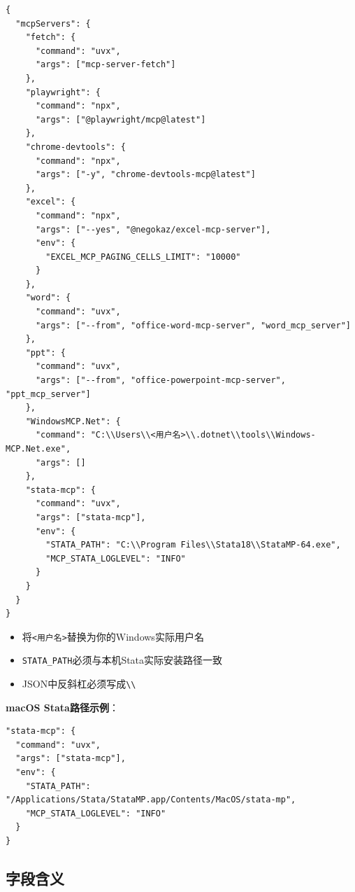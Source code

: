 \begin{lstlisting}[style=json]
{
  "mcpServers": {
    "fetch": {
      "command": "uvx",
      "args": ["mcp-server-fetch"]
    },
    "playwright": {
      "command": "npx",
      "args": ["@playwright/mcp@latest"]
    },
    "chrome-devtools": {
      "command": "npx",
      "args": ["-y", "chrome-devtools-mcp@latest"]
    },
    "excel": {
      "command": "npx",
      "args": ["--yes", "@negokaz/excel-mcp-server"],
      "env": {
        "EXCEL_MCP_PAGING_CELLS_LIMIT": "10000"
      }
    },
    "word": {
      "command": "uvx",
      "args": ["--from", "office-word-mcp-server", "word_mcp_server"]
    },
    "ppt": {
      "command": "uvx",
      "args": ["--from", "office-powerpoint-mcp-server", "ppt_mcp_server"]
    },
    "WindowsMCP.Net": {
      "command": "C:\\Users\\<用户名>\\.dotnet\\tools\\Windows-MCP.Net.exe",
      "args": []
    },
    "stata-mcp": {
      "command": "uvx",
      "args": ["stata-mcp"],
      "env": {
        "STATA_PATH": "C:\\Program Files\\Stata18\\StataMP-64.exe",
        "MCP_STATA_LOGLEVEL": "INFO"
      }
    }
  }
}
\end{lstlisting}

\begin{warningbox}[路径替换提醒]
\begin{itemize}[leftmargin=1em]
  \item 将\texttt{<用户名>}替换为你的Windows实际用户名
  \item \texttt{STATA\_PATH}必须与本机Stata实际安装路径一致
  \item JSON中反斜杠必须写成\texttt{\textbackslash\textbackslash}
\end{itemize}
\end{warningbox}

\textbf{macOS Stata路径示例}：

\begin{lstlisting}[style=json]
"stata-mcp": {
  "command": "uvx",
  "args": ["stata-mcp"],
  "env": {
    "STATA_PATH": "/Applications/Stata/StataMP.app/Contents/MacOS/stata-mp",
    "MCP_STATA_LOGLEVEL": "INFO"
  }
}
\end{lstlisting}

\subsection{字段含义}

